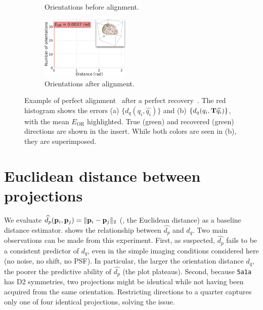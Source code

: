 \begin{figure}[ht!]
\begin{minipage}[t]{0.66\linewidth}
\begin{subfigure}[t]{0.49\linewidth}
            \caption{Orientations before alignment.}
        \end{subfigure}
        \hfill
        \begin{subfigure}[t]{0.49\linewidth}
            \centering
            \includegraphics[height=3cm]{figures/AfterAA.pdf}
            \caption{Orientations after alignment.}
        \end{subfigure}
        \caption{%
            Example of perfect alignment~ after a perfect recovery~.
            The red histogram shows the errors (a) $\{d_q(q_i, \widehat{q_i})\}$ and (b) $\{d_q(q_i, \mathbf{T} \widehat{q_i})\}$, with the mean $E_\text{OR}$ highlighted.
            True (green) and recovered (green) directions are shown in the insert.
            While both colors are seen in (b), they are superimposed.
        }\label{fig:5j0n-aa-loss-perfect-distances}
    \end{minipage}
\end{figure}

\section{Euclidean distance between projections}\label{apx:results:distance-estimation:euclidean}


We evaluate $\widehat{d_p}(\mathbf{p}_i, \mathbf{p}_j) = \| \mathbf{p}_i - \mathbf{p}_j \|_2$ (\ie, the Euclidean distance) as a baseline distance estimator.
 shows the relationship between $\widehat{d_p}$ and $d_q$.
Two main observations can be made from this experiment.
First, as suspected, $\widehat{d_p}$ fails to be a consistent predictor of $d_q$, even in the simple imaging conditions considered here (no noise, no shift, no PSF).
In particular, the larger the orientation distance $d_q$, the poorer the predictive ability of $\widehat{d_p}$ (the plot plateaus).
Second, because \texttt{5a1a} has D2 symmetries, two projections might be identical while not having been acquired from the same orientation.
Restricting directions to a quarter captures only one of four identical projections, solving the issue.

